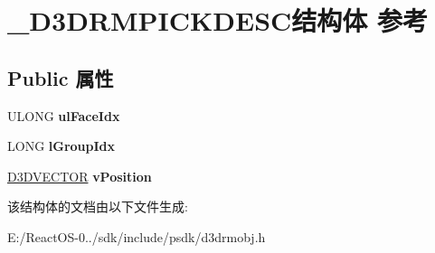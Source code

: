 \hypertarget{struct___d3_d_r_m_p_i_c_k_d_e_s_c}{}\section{\+\_\+\+D3\+D\+R\+M\+P\+I\+C\+K\+D\+E\+S\+C结构体 参考}
\label{struct___d3_d_r_m_p_i_c_k_d_e_s_c}
\subsection*{Public 属性}
\begin{DoxyCompactItemize}
\item 
\mbox{\label{struct___d3_d_r_m_p_i_c_k_d_e_s_c_abc1192e58c9ef255c07b8daff47ef1ab}} 
U\+L\+O\+NG {\bfseries ul\+Face\+Idx}
\item 
\mbox{\label{struct___d3_d_r_m_p_i_c_k_d_e_s_c_aeb95a8fcaa8d3f70f9d7735663d1fd22}} 
L\+O\+NG {\bfseries l\+Group\+Idx}
\item 
\mbox{\label{struct___d3_d_r_m_p_i_c_k_d_e_s_c_acf57bb28e9289a7a4475caad99788eb9}} 
\hyperlink{struct___d3_d_v_e_c_t_o_r}{D3\+D\+V\+E\+C\+T\+OR} {\bfseries v\+Position}
\end{DoxyCompactItemize}


该结构体的文档由以下文件生成\+:\begin{DoxyCompactItemize}
\item 
E\+:/\+React\+O\+S-\/0../sdk/include/psdk/d3drmobj.\+h\end{DoxyCompactItemize}
